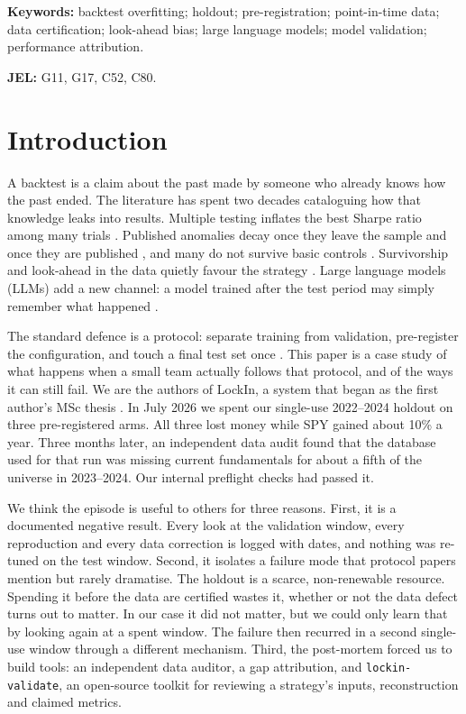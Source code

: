 \documentclass[11pt]{article}
\begin{document}
\medskip
\noindent\textbf{Keywords:} backtest overfitting; holdout; pre-registration; point-in-time data; data certification; look-ahead bias; large language models; model validation; performance attribution.

\noindent\textbf{JEL:} G11, G17, C52, C80.

\section{Introduction}

A backtest is a claim about the past made by someone who already knows how the past ended. The literature has spent two decades cataloguing how that knowledge leaks into results. Multiple testing inflates the best Sharpe ratio among many trials \citep{BaileyEtAl2014Notices,BaileyLopezDePrado2014,HarveyLiuZhu2016}. Published anomalies decay once they leave the sample and once they are published \citep{McLeanPontiff2016}, and many do not survive basic controls \citep{HouXueZhang2020}. Survivorship and look-ahead in the data quietly favour the strategy \citep{BrownEtAl1992}. Large language models (LLMs) add a new channel: a model trained after the test period may simply remember what happened \citep{GlassermanLin2023,LopezLiraTangZhu2025,LiEtAl2025ProfitMirage}.

The standard defence is a protocol: separate training from validation, pre-register the configuration, and touch a final test set once \citep{ArnottHarveyMarkowitz2019,LopezDePrado2018}. This paper is a case study of what happens when a small team actually follows that protocol, and of the ways it can still fail. We are the authors of LockIn, a system that began as the first author's MSc thesis \citep{Dominguez2026TFM}. In July 2026 we spent our single-use 2022--2024 holdout on three pre-registered arms. All three lost money while SPY gained about 10\% a year. Three months later, an independent data audit found that the database used for that run was missing current fundamentals for about a fifth of the universe in 2023--2024. Our internal preflight checks had passed it.

We think the episode is useful to others for three reasons. First, it is a documented negative result. Every look at the validation window, every reproduction and every data correction is logged with dates, and nothing was re-tuned on the test window. Second, it isolates a failure mode that protocol papers mention but rarely dramatise. The holdout is a scarce, non-renewable resource. Spending it before the data are certified wastes it, whether or not the data defect turns out to matter. In our case it did not matter, but we could only learn that by looking again at a spent window. The failure then recurred in a second single-use window through a different mechanism. Third, the post-mortem forced us to build tools: an independent data auditor, a gap attribution, and \texttt{lockin-validate}, an open-source toolkit for reviewing a strategy's inputs, reconstruction and claimed metrics.
\end{document}
